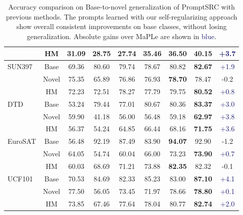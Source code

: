 \documentclass[10pt,twocolumn,letterpaper]{article}
\begin{document}
\begin{table}[t!]
{\begin{tabular}{lc|c c c c c c c}
                               & HM         & 31.09 & 28.75    & 27.74  & 35.46    & 36.50   & \textbf{40.15}  &  \textcolor{MidnightBlue}{{+3.7}}\\
\midrule
\multirow{3}{*}{SUN397}        & Base    & 69.36 & 80.60    &  79.74  &78.67       & 80.82    &\textbf{82.67 } &   \textcolor{MidnightBlue}{{+1.9}}\\
                               & Novel      & 75.35 & 65.89    &  76.86 &76.93    & \textbf{78.70 }        & {78.47}  &  \textcolor{Bittersweet}{{-0.2}}\\
                               & HM        & 72.23 & 72.51    &  78.27 &77.79   & 79.75    & \textbf{80.52}  &  \textcolor{MidnightBlue}{{+0.8}}\\
\midrule
\multirow{3}{*}{DTD}           & Base    & 53.24 & 79.44    & 77.01 &80.67        & 80.36      & \textbf{83.37}  &  \textcolor{MidnightBlue}{{+3.0}}\\
                               & Novel     & 59.90 & 41.18    & 56.00 &56.48      & 59.18       & \textbf{62.97 } &  \textcolor{MidnightBlue}{{+3.8}}\\
                               & HM          & 56.37 & 54.24    & 64.85 &66.44    & 68.16      & \textbf{71.75}  & \textcolor{MidnightBlue}{{+3.6}}\\
\midrule
\multirow{3}{*}{EuroSAT}       & Base    & 56.48 & 92.19    & 87.49  &83.90        & \textbf{94.07}       & {92.90}  &  \textcolor{Bittersweet}{{-1.2}}\\
                               & Novel      & 64.05 & 54.74    & 60.04& 66.00      & 73.23      & \textbf{73.90}  & \textcolor{MidnightBlue}{{+0.7}}\\
                               & HM          & 60.03 & 68.69    & 71.21& 73.88  & \textbf{82.35}   & {82.32}  &  \textcolor{Bittersweet}{{-0.1}}\\
\midrule
\multirow{3}{*}{UCF101}        & Base     & 70.53  & 84.69   & 82.33  &85.23         & 83.00       &\textbf{ 87.10}  & \textcolor{MidnightBlue}{{+4.1}}\\
                               & Novel      & 77.50  & 56.05   & 73.45  &71.97     &78.66         & \textbf{78.80}  &  \textcolor{MidnightBlue}{{+0.1}}\\
                               & HM          & 73.85  & 67.46   & 77.64 &78.04   & 80.77    & \textbf{82.74}  & \textcolor{MidnightBlue}{{+2.0}}\\
\bottomrule
\end{tabular}}\vspace{-0.5em}
    \caption{\small\textnormal{Accuracy comparison on Base-to-novel generalization of PromptSRC with previous methods}. The prompts learned with our self-regularizing approach show overall consistent improvements on base classes, without losing generalization. Absolute gains over MaPLe \cite{khattak2023maple} are shown
    in \textcolor{MidnightBlue}{blue}.}
    \label{tab:base-to-new}
\end{table} 
\end{document}
